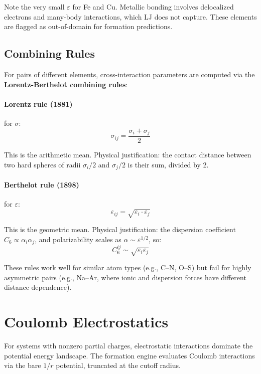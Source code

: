 \documentclass[11pt]{article}
\begin{document}
Note the very small $\varepsilon$ for Fe and Cu. Metallic bonding involves delocalized electrons and many-body interactions, which LJ does not capture. These elements are flagged as out-of-domain for formation predictions.

\subsection{Combining Rules}

For pairs of different elements, cross-interaction parameters are computed via the \textbf{Lorentz-Berthelot combining rules}:

\paragraph{Lorentz rule (1881)} for $\sigma$:
\begin{equation}
\sigma_{ij} = \frac{\sigma_i + \sigma_j}{2}
\end{equation}

This is the arithmetic mean. Physical justification: the contact distance between two hard spheres of radii $\sigma_i/2$ and $\sigma_j/2$ is their sum, divided by 2.

\paragraph{Berthelot rule (1898)} for $\varepsilon$:
\begin{equation}
\varepsilon_{ij} = \sqrt{\varepsilon_i \cdot \varepsilon_j}
\end{equation}

This is the geometric mean. Physical justification: the dispersion coefficient $C_6 \propto \alpha_i \alpha_j$, and polarizability scales as $\alpha \sim \varepsilon^{1/2}$, so:
\begin{equation}
C_6^{ij} \sim \sqrt{\varepsilon_i \varepsilon_j}
\end{equation}

These rules work well for similar atom types (e.g., C–N, O–S) but fail for highly asymmetric pairs (e.g., Na–Ar, where ionic and dispersion forces have different distance dependence).

\section{Coulomb Electrostatics}

For systems with nonzero partial charges, electrostatic interactions dominate the potential energy landscape. The formation engine evaluates Coulomb interactions via the bare $1/r$ potential, truncated at the cutoff radius.
\end{document}
